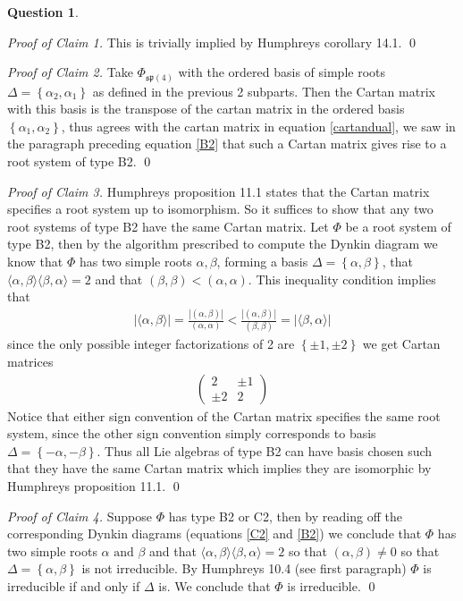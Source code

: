 \documentclass[10.5pt]{article}
\theoremstyle{definition}
\newtheorem{pb}{Question}
\numberwithin{example}{subsection}
\numberwithin{proposition}{subsection}
\newcommand{\set}[1]{\left\{#1\right\}}
\newcommand{\gen}[1]{\langle#1\rangle}
\newcommand{\abs}[1]{\left\vert#1\right\vert}
\newcommand{\tand}{\text{ and }}
\begin{document}
\begin{pb}
\begin{enumerate}
            \emph{Proof of Claim 1.} This is trivially implied by Humphreys corollary 14.1. \qed

            \emph{Proof of Claim 2.} Take \(\Phi_{\mathfrak{\mathfrak{sp}(4)}}\) with the ordered basis of simple roots \(\Delta = \set{\alpha_2,\alpha_1}\) as defined in the previous 2 subparts. Then the Cartan matrix with this basis is the transpose of the cartan matrix in the ordered basis \(\set{\alpha_1, \alpha_2}\), thus agrees with the cartan matrix in equation \eqref{cartandual}, we saw in the paragraph preceding equation \eqref{B2} that such a Cartan matrix gives rise to a root system of type B2. \qed

            \emph{Proof of Claim 3.} Humphreys proposition 11.1 states that the Cartan matrix specifies a root system up to isomorphism. So it suffices to show that any two root systems of type B2 have the same Cartan matrix. Let \(\Phi\) be a root system of type B2, then by the algorithm prescribed to compute the Dynkin diagram we know that \(\Phi\) has two simple roots \(\alpha,\beta\), forming a basis \(\Delta = \set{\alpha,\beta}\), that \(\gen{\alpha,\beta}\gen{\beta,\alpha} = 2\) and that \((\beta,\beta) < (\alpha,\alpha)\). This inequality condition implies that
            \begin{align}
                \abs{\gen{\alpha,\beta}} = \frac{\abs{(\alpha,\beta)}}{(\alpha,\alpha)} < \frac{\abs{(\alpha,\beta)}}{(\beta,\beta)} = \abs{\gen{\beta,\alpha}}
            \end{align}
            since the only possible integer factorizations of 2 are \(\set{\pm1,\pm2}\) we get Cartan matrices
            \begin{align}
                \begin{pmatrix} 2 & \pm 1 \\ \pm2 & 2 \end{pmatrix}
            \end{align}
            Notice that either sign convention of the Cartan matrix specifies the same root system, since the other sign convention simply corresponds to basis \(\Delta = \set{-\alpha,-\beta}\). Thus all Lie algebras of type B2 can have basis chosen such that they have the same Cartan matrix which implies they are isomorphic by Humphreys proposition 11.1. \qed

            \emph{Proof of Claim 4.} Suppose \(\Phi\) has type B2 or C2, then by reading off the corresponding Dynkin diagrams (equations \eqref{C2} and \eqref{B2}) we conclude that \(\Phi\) has two simple roots \(\alpha \tand \beta\) and that
            \(\gen{\alpha,\beta}\gen{\beta,\alpha} = 2\) so that \((\alpha,\beta) \neq 0\) so that \(\Delta = \set{\alpha,\beta}\) is not irreducible. By Humphreys 10.4 (see first paragraph) \(\Phi\) is irreducible if and only if \(\Delta\) is. We conclude that \(\Phi\) is irreducible. \qed
        \end{enumerate}
    \end{pb}
\end{document}
